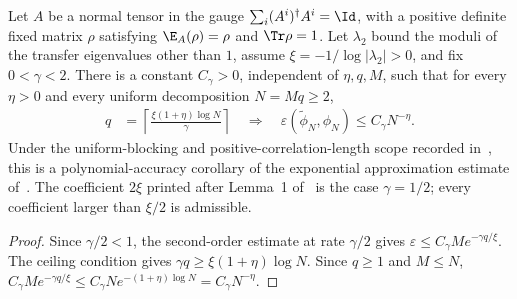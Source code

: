 \begin{lemma}%
    \label{thm:ldp_polynomial_accuracy_of_rate}
    \leanok
    Let $A$ be a normal tensor in the gauge $\sum_i(A^i)^\dagger A^i=\Id$,
    with a positive definite fixed matrix $\rho$ satisfying
    $\E_A(\rho)=\rho$ and $\Tr\rho=1$.
    Let $\lambda_2$ bound the moduli of the transfer eigenvalues other than
    $1$, assume $\xi=-1/\log|\lambda_2|>0$, and fix $0<\gamma<2$.
    There is a constant $C_\gamma>0$, independent of $\eta,q,M$, such
    that for every $\eta>0$ and every uniform decomposition $N=Mq\geq2$,
    \begin{align}
        q & =\left\lceil\frac{\xi(1+\eta)\log N}{\gamma}\right\rceil
        \quad\Longrightarrow\quad
        \varepsilon(\widetilde\phi_N,\phi_N)\leq C_\gamma N^{-\eta}.
        \label{eq:ldp_polynomial_prescribed_rate}
    \end{align}
    Under the uniform-blocking and positive-correlation-length scope recorded
    in~\cite{gap:mswc24_polynomial_accuracy_uniform_blocks}, this is a
    polynomial-accuracy corollary of the exponential approximation estimate
    of~\cite{Malz2024Preparation}.
    The coefficient $2\xi$ printed after Lemma~1 of~\cite{Malz2024Preparation}
    is the case $\gamma=1/2$; every coefficient larger than $\xi/2$ is
    admissible.
\end{lemma}
\begin{proof}\leanok
    Since $\gamma/2<1$, the second-order estimate at rate $\gamma/2$ gives
    $\varepsilon\leq C_\gamma M e^{-\gamma q/\xi}$.
    The ceiling condition gives $\gamma q\geq\xi(1+\eta)\log N$.
    Since $q\geq1$ and $M\leq N$,
    $C_\gamma M e^{-\gamma q/\xi}\leq C_\gamma N e^{-(1+\eta)\log N}
        =C_\gamma N^{-\eta}$.
\end{proof}

